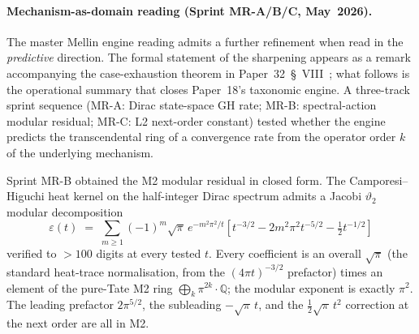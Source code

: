 \documentclass[aps,pra,twocolumn,superscriptaddress,longbibliography]{revtex4-2}
\begin{document}
\paragraph{Mechanism-as-domain reading (Sprint MR-A/B/C, May~2026).}
The master Mellin engine reading admits a further refinement when read
in the \emph{predictive} direction. The formal statement of the
sharpening appears as a remark accompanying the case-exhaustion theorem
in Paper~32~\S~VIII~\cite{loutey_paper32}; what follows is the
operational summary that closes Paper~18's taxonomic engine. A
three-track sprint sequence (MR-A: Dirac state-space GH rate;
MR-B: spectral-action modular residual; MR-C: L2 next-order constant)
tested whether the engine predicts the transcendental ring of a
convergence rate from the operator order $k$ of the underlying mechanism.

Sprint MR-B obtained the M2 modular residual in closed form. The
Camporesi--Higuchi heat kernel on the half-integer Dirac spectrum
admits a Jacobi $\vartheta_2$ modular decomposition
\begin{equation}
\label{eq:dirac_modular_residual}
   \varepsilon(t) \;=\;
   \sum_{m \ge 1} (-1)^m \sqrt{\pi}\, e^{-m^2 \pi^2 / t}
     \left[ t^{-3/2} - 2 m^2 \pi^2 t^{-5/2} - \tfrac{1}{2} t^{-1/2}\right]
\end{equation}
verified to $> 100$ digits at every tested $t$. Every coefficient is
an overall $\sqrt{\pi}$ (the standard heat-trace normalisation, from the
$(4\pi t)^{-3/2}$ prefactor) times an element of the pure-Tate M2 ring
$\bigoplus_k \pi^{2k}\cdot\mathbb{Q}$;
the modular exponent is exactly $\pi^2$. The leading prefactor
$2\pi^{5/2}$, the subleading $-\sqrt{\pi}\,t$, and the $\tfrac{1}{2}\sqrt{\pi}\,t^2$
correction at the next order are all in M2.
\end{document}
